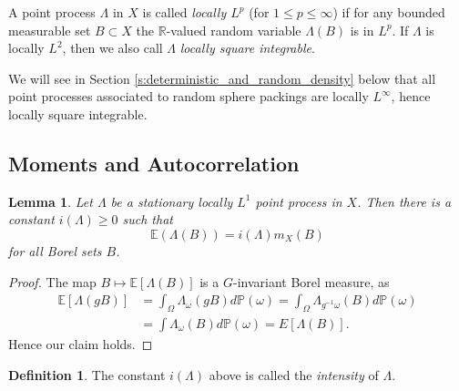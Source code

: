 \documentclass[12pt,reqno,a4paper]{amsart}
\theoremstyle{theorem}
\newtheorem{lemma}[theorem]{Lemma}
\theoremstyle{definition}
\newtheorem{definition}[theorem]{Definition}
\numberwithin{theorem}{section}
\numberwithin{equation}{section}
\newcommand{\R}{\mathbb{R}}
\begin{document}
A point process $\Lambda$ in $X$ is called \emph{locally $L^p$} (for $1\leq p\leq \infty$) if for any bounded measurable set $B\subset X$ the $\R$-valued random variable $\Lambda(B)$ is in $L^p$. 
If $\Lambda$ is locally $L^2$, then we also call $\Lambda$ \emph{locally square integrable}.

We will see in Section \ref{s:deterministic_and_random_density} below that all point processes associated to random sphere packings are locally $L^\infty$, hence locally square integrable.

\subsection{Moments and Autocorrelation}
\begin{lemma}\label{l:palm_formula}
	Let $\Lambda$ be a stationary locally $L^1$ point process in $X$. Then there is a constant $i(\Lambda)\geq0$ such that
	\[\mathbb{E}(\Lambda(B)) = i(\Lambda)m_X(B)\]
	for all Borel sets $B$.
\end{lemma}
\begin{proof}
	The map $B\mapsto \mathbb{E}[\Lambda(B)]$ is a $G$-invariant Borel measure,
	as 
	\begin{align*}
		\mathbb{E}[\Lambda(gB)] &= \int_\Omega \Lambda_\omega(gB)d\mathbb{P}(\omega) = \int_\Omega \Lambda_{g^{-1}\omega}(B)d\mathbb{P}(\omega)\\ 
		&= \int \Lambda_\omega(B)d\mathbb{P}(\omega) = E[\Lambda(B)].
	\end{align*}
	Hence our claim holds.
\end{proof}
\begin{definition}
	The constant $i(\Lambda)$ above is called the \emph{intensity} of $\Lambda$.
\end{definition}
\end{document}
